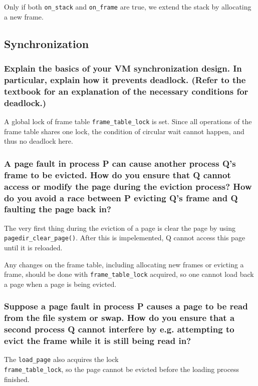 \documentclass[sigconf, nonacm, balance=false, urlbreakonhyphens=true]{acmart}
\begin{document}
                Only if both \texttt{on\_stack} and \texttt{on\_frame} are true, we extend the stack by allocating a new frame. 
        
        \subsection{Synchronization}

            \subsubsection{Explain the basics of your VM synchronization design.  In particular, explain how it prevents deadlock.  (Refer to the textbook for an explanation of the necessary conditions for deadlock.) }

                A global lock of frame table \texttt{frame\_table\_lock} is set. Since all operations of the frame table shares one lock, the condition of circular wait cannot happen, and thus no deadlock here. 

            \subsubsection{A page fault in process P can cause another process Q's frame to be evicted.  How do you ensure that Q cannot access or modify the page during the eviction process?  How do you avoid a race between P evicting Q's frame and Q faulting the page back in? }

                The very first thing during the eviction of a page is clear the page by using \texttt{pagedir\_clear\_page()}. After this is impelemented, Q cannot access this page until it is reloaded. 

                Any changes on the frame table, including allocating new frames or evicting a frame, should be done with \texttt{frame\_table\_lock} acquired, so one cannot load back a page when a page is being evicted. 

            \subsubsection{Suppose a page fault in process P causes a page to be read from the file system or swap.  How do you ensure that a second process Q cannot interfere by e.g. attempting to evict the frame while it is still being read in? }

                The \texttt{load\_page} also acquires the lock \\ \texttt{frame\_table\_lock}, so the page cannot be evicted before the loading process finished. 
\end{document}

